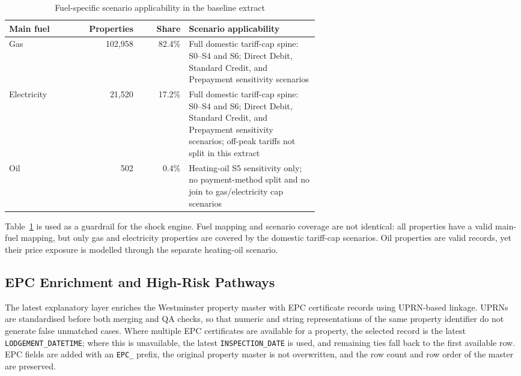 \begin{table}[htbp]
\centering
\footnotesize
\setlength{\tabcolsep}{4pt}
\caption{Fuel-specific scenario applicability in the baseline extract}
\label{tab:scenario-applicability}
\begin{tabular}{p{0.18\linewidth}rrp{0.42\linewidth}}
\toprule
Main fuel & Properties & Share & Scenario applicability \\
\midrule
Gas & 102,958 & 82.4\% & Full domestic tariff-cap spine: S0--S4 and S6; Direct Debit, Standard Credit, and Prepayment sensitivity scenarios \\
Electricity & 21,520 & 17.2\% & Full domestic tariff-cap spine: S0--S4 and S6; Direct Debit, Standard Credit, and Prepayment sensitivity scenarios; off-peak tariffs not split in this extract \\
Oil & 502 & 0.4\% & Heating-oil S5 sensitivity only; no payment-method split and no join to gas/electricity cap scenarios \\
\bottomrule
\end{tabular}
\end{table}

Table~\ref{tab:scenario-applicability} is used as a guardrail for the shock engine. Fuel mapping and scenario coverage are not identical: all properties have a valid main-fuel mapping, but only gas and electricity properties are covered by the domestic tariff-cap scenarios. Oil properties are valid records, yet their price exposure is modelled through the separate heating-oil scenario.

\subsection{EPC Enrichment and High-Risk Pathways}

The latest explanatory layer enriches the Westminster property master with EPC certificate records using UPRN-based linkage. UPRNs are standardised before both merging and QA checks, so that numeric and string representations of the same property identifier do not generate false unmatched cases. Where multiple EPC certificates are available for a property, the selected record is the latest \texttt{LODGEMENT\_DATETIME}; where this is unavailable, the latest \texttt{INSPECTION\_DATE} is used, and remaining ties fall back to the first available row. EPC fields are added with an \texttt{EPC\_} prefix, the original property master is not overwritten, and the row count and row order of the master are preserved.

